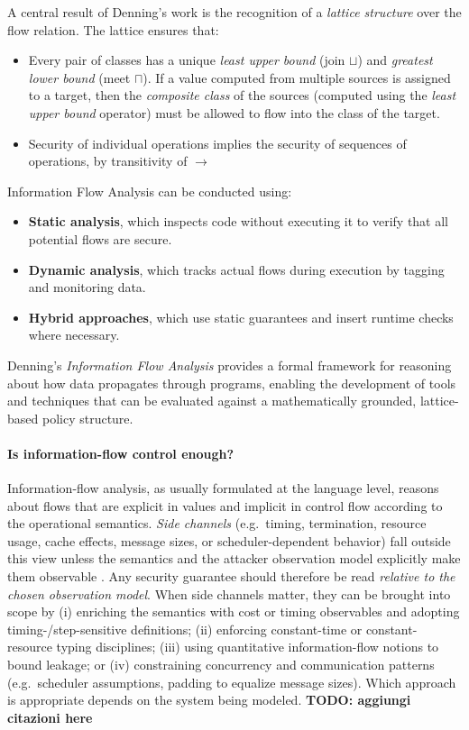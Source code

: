 \documentclass[12pt,a4paper,twoside]{book}
\begin{document}
A central result of Denning’s work is the recognition of a \textit{lattice structure} over the flow relation. The lattice ensures that:
\begin{itemize}
  \item Every pair of classes has a unique \textit{least upper bound} (join \( \sqcup \)) and \textit{greatest lower bound} (meet \( \sqcap \)).
If a value computed from multiple sources is assigned to a target, then the \textit{composite class} of the sources (computed using the \textit{least upper bound} operator) must be allowed to flow into the class of the target.
  \item Security of individual operations implies the security of sequences of operations, by transitivity of $\rightarrow$
\end{itemize}

Information Flow Analysis can be conducted using:
\begin{itemize}
  \item \textbf{Static analysis}, which inspects code without executing it to verify that all potential flows are secure.
  \item \textbf{Dynamic analysis}, which tracks actual flows during execution by tagging and monitoring data.
  \item \textbf{Hybrid approaches}, which use static guarantees and insert runtime checks where necessary.
\end{itemize}

Denning's \textit{Information Flow Analysis} provides a formal framework for reasoning about how data propagates through programs, enabling the development of tools and techniques that can be evaluated against a mathematically grounded, lattice-based policy structure.

\paragraph{Is information-flow control enough?}
Information-flow analysis, as usually formulated at the language level, reasons
about flows that are explicit in values and implicit in control flow according to
the operational semantics\cite{sabelfeld2003language}.
\emph{Side channels} (e.g.\ timing, termination,
resource usage, cache effects, message sizes, or scheduler-dependent behavior)
fall outside this view unless the semantics and the attacker observation model
explicitly make them observable .
Any security guarantee should therefore be read
\emph{relative to the chosen observation model}. When side channels matter, they
can be brought into scope by (i) enriching the semantics with cost or timing
observables and adopting timing-/step-sensitive definitions; (ii) enforcing
constant-time or constant-resource typing disciplines; (iii) using quantitative
information-flow notions to bound leakage; or (iv) constraining concurrency and
communication patterns (e.g.\ scheduler assumptions, padding to equalize message
sizes). Which approach is appropriate depends on the system being modeled.
\textbf{TODO: aggiungi citazioni here}
\end{document}
